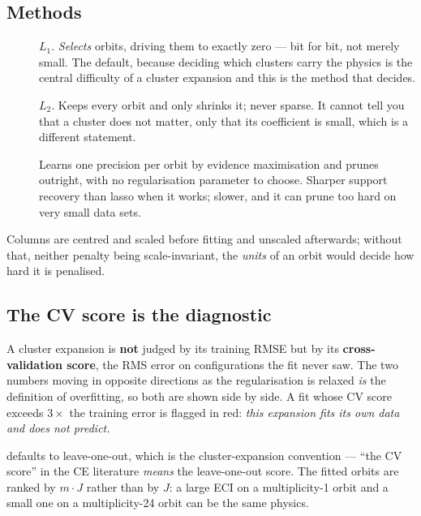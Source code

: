 \subsection{Methods}

\begin{description}
  \item[] $L_1$. \emph{Selects} orbits, driving
    them to exactly zero --- bit for bit, not merely small. The default, because
    deciding which clusters carry the physics is the central difficulty of a
    cluster expansion and this is the method that decides.
  \item[] $L_2$. Keeps every orbit and only
    shrinks it; never sparse. It cannot tell you that a cluster does not matter,
    only that its coefficient is small, which is a different statement.
  \item[] Learns one precision per orbit by evidence
    maximisation and prunes outright, with no regularisation parameter to
    choose. Sharper support recovery than lasso when it works; slower, and it
    can prune too hard on very small data sets.
\end{description}

Columns are centred and scaled before fitting and unscaled afterwards; without
that, neither penalty being scale-invariant, the \emph{units} of an orbit would
decide how hard it is penalised.

\subsection{The CV score is the diagnostic}

\begin{calwarn}
A cluster expansion is \textbf{not} judged by its training RMSE but by its
\textbf{cross-validation score}, the RMS error on configurations the fit never
saw. The two numbers moving in opposite directions as the regularisation is
relaxed \emph{is} the definition of overfitting, so both are shown side by side.
A fit whose CV score exceeds $3\times$ the training error is flagged in red:
\emph{this expansion fits its own data and does not predict.}
\end{calwarn}

 defaults to leave-one-out, which is the cluster-expansion
convention --- ``the CV score'' in the CE literature \emph{means} the
leave-one-out score. The fitted orbits are ranked by $m\cdot J$ rather than by
$J$: a large ECI on a multiplicity-1 orbit and a small one on a
multiplicity-24 orbit can be the same physics.

